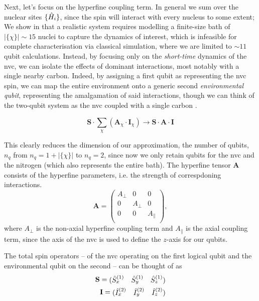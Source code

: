 Next, let's focus on the hyperfine coupling term. 
In general we sum over the nuclear sites $\{ \hat{H}_i \}$, 
    since the spin will interact with every nucleus to some extent; 
We show in \cite{gentile2020learning} that a realistic system requires modelling a 
    finite-size bath of $|\{\chi\}|\sim 15$ 
    nuclei to capture the dynamics of interest, 
    which is infeasible for complete characterisation via classical simulation, 
    where we are limited to $\sim 11$ qubit calculations\footnotemark. 
Instead, by focusing only on the \emph{short-time} dynamics of the \gls{nvc}, 
    we can isolate the effects of dominant interactions, 
    most notably with a single nearby \gls{carbon}. 
Indeed, by assigning a first qubit as representing the \gls{nvc} spin, 
    we can map the entire environment onto a generic second \emph{environmental qubit}, 
    representing the amalgamation of said interactions, 
    though we can think of the two-qubit system as the \gls{nvc} coupled with a single \gls{carbon} \cite{smeltzer201113c}. 

\begin{equation}
    \mathbf{S} \cdot \sum_{\chi} \left( \mathbf{A}_{\chi} \cdot \mathbf{I}_{\chi} \right)
    \rightarrow 
    \mathbf{S} \cdot \mathbf{A} \cdot \mathbf{I} 
\end{equation}

This clearly reduces the dimension of our approximation, the number of qubits, $n_q$ 
    from $n_q = 1 + |\{\chi\}|$ to $n_q = 2$, 
    since now we only retain qubits for the \gls{nvc} and the \gls{nitrogen} 
    (which also represents the entire bath).
The hyperfine tensor $\mathbf{A}$ consists of the hyperfine parameters, 
    i.e. the strength of correspdoning interactions. 
\begin{equation}
    \mathbf{A} = 
    \begin{pmatrix}
        A_{\perp} & 0 & 0 \\    
        0 & A_{\perp} & 0 \\
        0 & 0 & A_{\|} \\
    \end{pmatrix},
\end{equation}
    where $A_{\perp}$ is the non-axial hyperfine coupling term and $A_{\|}$ is the axial coupling term, 
    since the axis of the \gls{nvc} is used to define the $z$-axis for our qubits. 

The total spin operators -- 
    of the \gls{nvc} operating on the first logical qubit
    and the environmental qubit on the second -- 
    can be thought of as
\begin{equation}
    \label{total_spin_operators}
    \begin{split}
    \mathbf{S} = \begin{matrix}( \hat{S}_x^{(1)}  & \hat{S}_y^{(1)} & \hat{S}_z^{(1)} )\end{matrix} \\
    \mathbf{I} = \begin{matrix}( \hat{I}_x^{(2)} & \hat{I}_y^{(2)} & \hat{I}_z^{(2)}  )\end{matrix} 
    \end{split}
\end{equation}

